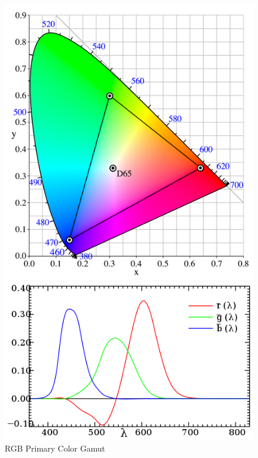 \documentclass{article}
\begin{document}
\begin{figure}[htbp]
    \centering
    \setlength{\abovecaptionskip}{0.cm}
    \begin{minipage}[b]{0.24\linewidth}
        \centering
        \includegraphics[width=\textwidth]{sRGB.png}
        \caption{RGB Primary Color Gamut}
        \label{srgb}
    \end{minipage}
    \begin{minipage}[b]{0.37\linewidth}
        \centering
        \includegraphics[width=\textwidth]{RGBCMF.png}

\end{minipage}
\end{figure}
\end{document}
